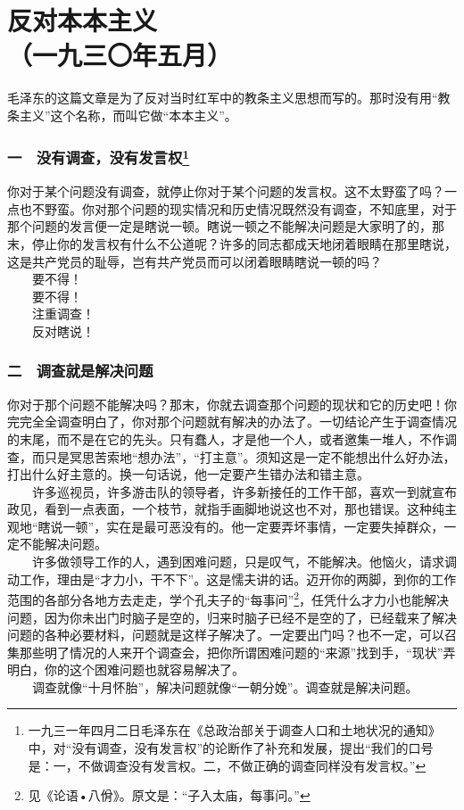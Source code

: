 \documentclass[cn,11pt,chinese]{elegantbook}
\def\myformat#1{\hfil\hfil #1}
\begin{document}
\newpage\section*{\myformat{反对本本主义}\\\myformat{（一九三〇年五月）}}
\begin{introduction}\item  毛泽东的这篇文章是为了反对当时红军中的教条主义思想而写的。那时没有用“教条主义”这个名称，而叫它做“本本主义”。\end{introduction}
\subsubsection*{\myformat{一　没有调查，没有发言权\footnote[1]{ 一九三一年四月二日毛泽东在《总政治部关于调查人口和土地状况的通知》中，对“没有调查，没有发言权”的论断作了补充和发展，提出“我们的口号是：一，不做调查没有发言权。二，不做正确的调查同样没有发言权。”}}}
你对于某个问题没有调查，就停止你对于某个问题的发言权。这不太野蛮了吗？一点也不野蛮。你对那个问题的现实情况和历史情况既然没有调查，不知底里，对于那个问题的发言便一定是瞎说一顿。瞎说一顿之不能解决问题是大家明了的，那末，停止你的发言权有什么不公道呢？许多的同志都成天地闭着眼睛在那里瞎说，这是共产党员的耻辱，岂有共产党员而可以闭着眼睛瞎说一顿的吗？\\
　　要不得！\\
　　要不得！\\
　　注重调查！\\
　　反对瞎说！\\
\subsubsection*{\myformat{二　调查就是解决问题}}
你对于那个问题不能解决吗？那末，你就去调查那个问题的现状和它的历史吧！你完完全全调查明白了，你对那个问题就有解决的办法了。一切结论产生于调查情况的末尾，而不是在它的先头。只有蠢人，才是他一个人，或者邀集一堆人，不作调查，而只是冥思苦索地“想办法”，“打主意”。须知这是一定不能想出什么好办法，打出什么好主意的。换一句话说，他一定要产生错办法和错主意。\\
　　许多巡视员，许多游击队的领导者，许多新接任的工作干部，喜欢一到就宣布政见，看到一点表面，一个枝节，就指手画脚地说这也不对，那也错误。这种纯主观地“瞎说一顿”，实在是最可恶没有的。他一定要弄坏事情，一定要失掉群众，一定不能解决问题。\\
　　许多做领导工作的人，遇到困难问题，只是叹气，不能解决。他恼火，请求调动工作，理由是“才力小，干不下”。这是懦夫讲的话。迈开你的两脚，到你的工作范围的各部分各地方去走走，学个孔夫子的“每事问”\footnote[2]{ 见《论语•八佾》。原文是：“子入太庙，每事问。”}，任凭什么才力小也能解决问题，因为你未出门时脑子是空的，归来时脑子已经不是空的了，已经载来了解决问题的各种必要材料，问题就是这样子解决了。一定要出门吗？也不一定，可以召集那些明了情况的人来开个调查会，把你所谓困难问题的“来源”找到手，“现状”弄明白，你的这个困难问题也就容易解决了。\\
　　调查就像“十月怀胎”，解决问题就像“一朝分娩”。调查就是解决问题。\\
\end{document}
